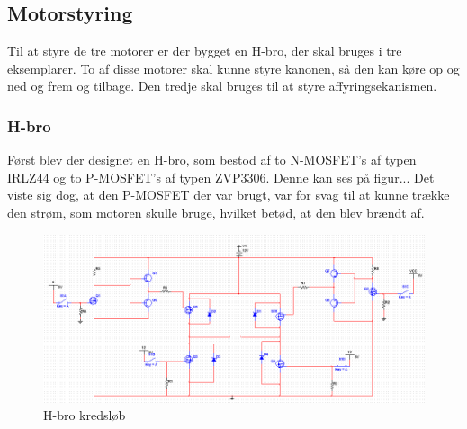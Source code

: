 \subsection{Motorstyring}
Til at styre de tre motorer er der bygget en H-bro, der skal bruges i tre eksemplarer. To af disse motorer skal kunne styre kanonen, så den kan køre op og ned og frem og tilbage. Den tredje skal bruges til at styre affyringsekanismen. 

\subsubsection{H-bro}
Først blev der designet en H-bro, som bestod af to N-MOSFET's af typen IRLZ44 og to P-MOSFET's af typen ZVP3306. Denne kan ses på figur... Det viste sig dog, at den P-MOSFET der var brugt, var for svag til at kunne trække den strøm, som motoren skulle bruge, hvilket betød, at den blev brændt af. 


\begin{figure}[H]
	\centering
	\includegraphics[]{DesignOgImplementering/images/motorkreds}
	\caption{H-bro kredsløb}
	\end{figure}

